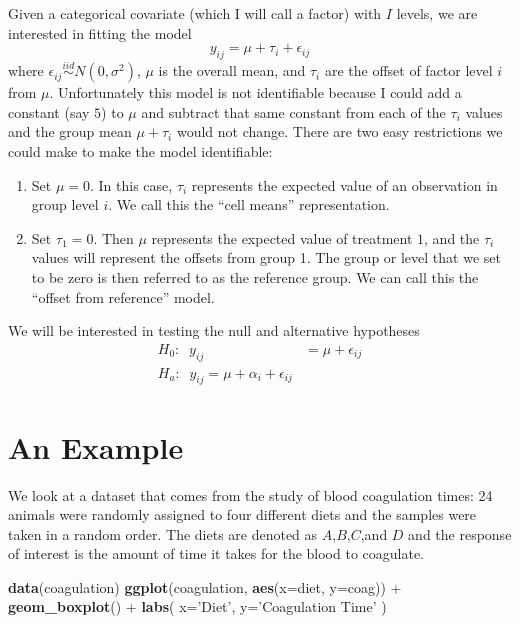 \documentclass[]{book}
\newenvironment{Shaded}{\begin{snugshade}}{\end{snugshade}}
\newcommand{\KeywordTok}[1]{\textcolor[rgb]{0.13,0.29,0.53}{\textbf{{#1}}}}
\newcommand{\DataTypeTok}[1]{\textcolor[rgb]{0.13,0.29,0.53}{{#1}}}
\newcommand{\StringTok}[1]{\textcolor[rgb]{0.31,0.60,0.02}{{#1}}}
\newcommand{\NormalTok}[1]{{#1}}
\theoremstyle{definition}
\theoremstyle{definition}
\theoremstyle{remark}
\begin{document}
Given a categorical covariate (which I will call a factor) with \(I\)
levels, we are interested in fitting the model
\[y_{ij}=\mu+\tau_{i}+\epsilon_{ij}\] where
\(\epsilon_{ij}\stackrel{iid}{\sim}N\left(0,\sigma^{2}\right)\), \(\mu\)
is the overall mean, and \(\tau_{i}\) are the offset of factor level
\(i\) from \(\mu\). Unfortunately this model is not identifiable because
I could add a constant (say \(5\)) to \(\mu\) and subtract that same
constant from each of the \(\tau_{i}\) values and the group mean
\(\mu+\tau_{i}\) would not change. There are two easy restrictions we
could make to make the model identifiable:

\begin{enumerate}
\def\labelenumi{\arabic{enumi}.}
\item
  Set \(\mu=0\). In this case, \(\tau_{i}\) represents the expected
  value of an observation in group level \(i\). We call this the ``cell
  means'' representation.
\item
  Set \(\tau_{1}=0\). Then \(\mu\) represents the expected value of
  treatment \(1\), and the \(\tau_{i}\) values will represent the
  offsets from group 1. The group or level that we set to be zero is
  then referred to as the reference group. We can call this the ``offset
  from reference'' model.
\end{enumerate}

We will be interested in testing the null and alternative hypotheses
\[\begin{aligned}
H_{0}:\;\;y_{ij}    &=  \mu+\epsilon_{ij}              \\
H_{a}:\;\;y_{ij}    =   \mu+\alpha_{i}+\epsilon_{ij}
\end{aligned}\]

\section{An Example}\label{an-example}

We look at a dataset that comes from the study of blood coagulation
times: 24 animals were randomly assigned to four different diets and the
samples were taken in a random order. The diets are denoted as
\(A\),\(B\),\(C\),and \(D\) and the response of interest is the amount
of time it takes for the blood to coagulate.

\begin{Shaded}
\begin{Highlighting}[]
\KeywordTok{data}\NormalTok{(coagulation)}
\KeywordTok{ggplot}\NormalTok{(coagulation, }\KeywordTok{aes}\NormalTok{(}\DataTypeTok{x=}\NormalTok{diet, }\DataTypeTok{y=}\NormalTok{coag)) +}\StringTok{ }
\StringTok{    }\KeywordTok{geom_boxplot}\NormalTok{() +}
\StringTok{    }\KeywordTok{labs}\NormalTok{( }\DataTypeTok{x=}\StringTok{'Diet'}\NormalTok{, }\DataTypeTok{y=}\StringTok{'Coagulation Time'} \NormalTok{)}
\end{Highlighting}
\end{Shaded}
\end{document}
